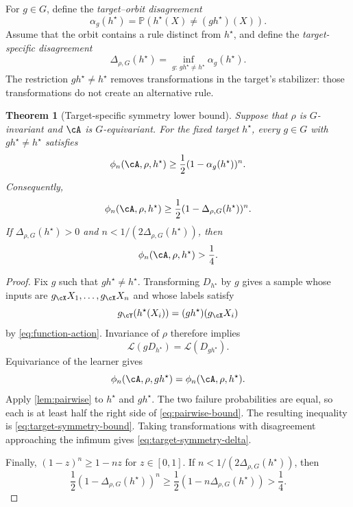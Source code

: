 \documentclass[11pt,twoside]{article}
\renewcommand{\P}{\mathbb P}
\newcommand{\Law}{\mathcal L}
\newtheorem{theorem}{Theorem}[section]
\theoremstyle{definition}
\theoremstyle{remark}
\begin{document}
For \(g\in G\), define the \emph{target--orbit disagreement}
\begin{equation}
 \alpha_g(h^\star)
 =\P(h^\star(X)\ne(gh^\star)(X)).
 \label{eq:orbit-disagreement}
\end{equation}
Assume that the orbit contains a rule distinct from \(h^\star\), and define the
\emph{target-specific disagreement}
\begin{equation}
 \Delta_{\rho,G}(h^\star)
 =\inf_{g:\,gh^\star\ne h^\star}\alpha_g(h^\star).
 \label{eq:target-disagreement}
\end{equation}
The restriction \(gh^\star\ne h^\star\) removes transformations in the
target's stabilizer: those transformations do not create an alternative rule.

\begin{theorem}[Target-specific symmetry lower bound]
\label{thm:target-symmetry}
Suppose that \(\rho\) is \(G\)-invariant and \(\cA\) is
\(G\)-equivariant. For the fixed target \(h^\star\), every
\(g\in G\) with \(gh^\star\ne h^\star\) satisfies
\begin{equation}
 \phi_n(\cA,\rho,h^\star)
 \ge \frac12(1-\alpha_g(h^\star))^n.
 \label{eq:target-symmetry-bound}
\end{equation}
Consequently,
\begin{equation}
 \phi_n(\cA,\rho,h^\star)
 \ge \frac12(1-\Delta_{\rho,G}(h^\star))^n.
 \label{eq:target-symmetry-delta}
\end{equation}
If \(\Delta_{\rho,G}(h^\star)>0\) and
\(n<1/(2\Delta_{\rho,G}(h^\star))\), then
\begin{equation}
 \phi_n(\cA,\rho,h^\star)>\frac14.
 \label{eq:quarter-lower-bound}
\end{equation}
\end{theorem}
\begin{proof}
Fix \(g\) such that \(gh^\star\ne h^\star\). Transforming
\(D_{h^\star}\) by \(g\) gives a sample whose inputs are
\(g_{\cX}X_1,\ldots,g_{\cX}X_n\) and whose labels satisfy
\[
 g_{\cY}(h^\star(X_i))=(gh^\star)(g_{\cX}X_i)
\]
by \cref{eq:function-action}. Invariance of \(\rho\) therefore implies
\begin{equation}
 \Law(gD_{h^\star})=\Law(D_{gh^\star}).
 \label{eq:transformed-sample-law}
\end{equation}
Equivariance of the learner gives
\[
 \phi_n(\cA,\rho,gh^\star)
 =\phi_n(\cA,\rho,h^\star).
\]
Apply \cref{lem:pairwise} to \(h^\star\) and \(gh^\star\). The two failure
probabilities are equal, so each is at least half the right side of
\cref{eq:pairwise-bound}. The resulting inequality is
\cref{eq:target-symmetry-bound}.
Taking transformations with disagreement approaching the infimum gives
\cref{eq:target-symmetry-delta}.

Finally, \((1-z)^n\ge1-nz\) for \(z\in[0,1]\). If
\(n<1/(2\Delta_{\rho,G}(h^\star))\), then
\[
 \frac12(1-\Delta_{\rho,G}(h^\star))^n
 \ge\frac12(1-n\Delta_{\rho,G}(h^\star))
 >\frac14.
\]
\end{proof}
\end{document}
